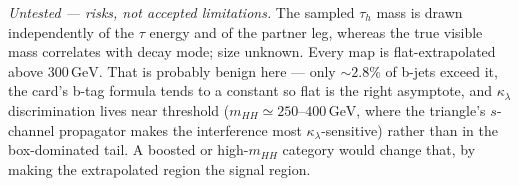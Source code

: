 \documentclass[11pt,a4paper]{article}
\newcommand{\tauh}{\tau_{h}}
\newcommand{\kl}{\kappa_{\lambda}}
\begin{document}
\emph{Untested --- risks, not accepted limitations.} The sampled $\tauh$ mass is drawn
independently of the $\tau$ energy and of the partner leg, whereas the true visible mass
correlates with decay mode; size unknown. Every map is flat-extrapolated above
$300\,\si{\GeV}$. That is probably benign here --- only ${\sim}2.8\%$ of b-jets exceed it,
the card's b-tag formula tends to a constant so flat is the right asymptote, and $\kl$
discrimination lives near threshold ($m_{HH}\simeq250$--$400\,\si{\GeV}$, where the triangle's
$s$-channel propagator makes the interference most $\kl$-sensitive) rather than in the
box-dominated tail. A boosted or high-$m_{HH}$ category would change that, by making the
extrapolated region the signal region.
\end{document}
